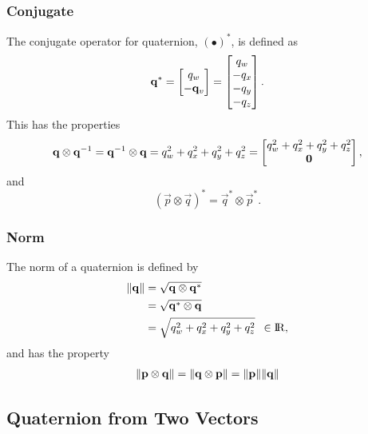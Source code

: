 \subsubsection{Conjugate}

The conjugate operator for quaternion, ${(\bullet)}^{\ast}$, is
defined as
%
\begin{equation}
  {{\mathbf{q}}}^{\ast}
  =
  \begin{bmatrix}
    q_w \\
    - {\mathbf{q}}_v
  \end{bmatrix}
  =
  \begin{bmatrix}
    q_w \\
    - q_x \\
    - q_y \\
    - q_z
  \end{bmatrix}.
\end{equation}
%
This has the properties
%
\begin{equation}
  {{\mathbf{q}}} \otimes {{\mathbf{q}}}^{-1}
  = {{\mathbf{q}}}^{-1} \otimes {{\mathbf{q}}}
  = q_{w}^{2} + q_{x}^{2} + q_{y}^{2} + q_{z}^{2}
  =
  \begin{bmatrix}
    q_{w}^{2} + q_{x}^{2} + q_{y}^{2} + q_{z}^{2} \\
    {\mathbf{0}}
  \end{bmatrix},
\end{equation}
%
and
%
\begin{equation}
  (\Vec{p} \otimes \Vec{q})^{\ast}
  = \Vec{q}^{\ast} \otimes \Vec{p}^{\ast}.
\end{equation}


\subsubsection{Norm}

The norm of a quaternion is defined by
%
\begin{align}
  {\|{{\mathbf{q}}}\|} &= \sqrt{{{\mathbf{q}}} \otimes {{\mathbf{q}}}^{\ast}} \\
    &= \sqrt{{{\mathbf{q}}}^{\ast} \otimes {{\mathbf{q}}}} \\
    &= \sqrt{q_{w}^{2} + q_{x}^{2} + q_{y}^{2} + q_{z}^{2}}
    \enspace \in {\rm I\!R},
\end{align}
%
and has the property
%
\begin{align}
  {\|{\mathbf{p}} \otimes {\mathbf{q}}\|} =
  {\|{\mathbf{q}} \otimes {\mathbf{p}}\|} =
  {\|{\mathbf{p}}\|} {\|{\mathbf{q}}\|}
\end{align}



\subsection{Quaternion from Two Vectors}

